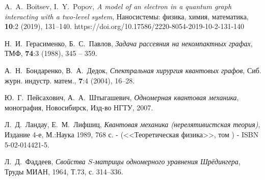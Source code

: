 \documentclass[a4 paper, 12 pt]{extarticle}
\newcommand{\RomanNumeralCaps}[1]
{\MakeUppercase{\romannumeral #1}}
\begin{document}
\begin{thebibliography}{1}
	 A.~A.~Boitsev, I.~Y.~Popov, {\it A model of an electron in a quantum graph interacting with a two-level system}, Наносистемы: физика, химия, математика, \textbf{10}:2 (2019), 131--140. https://doi.org/10.17586/2220-8054-2019-10-2-131-140
	
	 Н.~И.~Герасименко, Б.~С.~Павлов, {\it Задача рассеяния на некомпактных графах}, ТМФ, \textbf{74}:3 (1988), 345 -- 359.
	
	 А.~Н.~Бондаренко, В.~А.~Дедок, {\it Спектральная хирургия квантовых графов}, Сиб. журн. индустр. матем., \textbf{7}:4 (2004), 16--28.
	
	 Ю.~Г.~Пейсахович, А.~А.~Штыгашевич, {\it Одномерная квантовая механика}, монография, Новосибирск, Изд-во НГТУ, 2007.
	
	 Л.~Д.~Ландау, Е.~М.~Лифшиц, {\it Квантовая механика (нерелятивистская теория)}, Издание 4-е, М.:Наука 1989, 768 с. - (<<Теоретическая физика>>, том \RomanNumeralCaps{3}) - ISBN 5-02-014421-5.
	
	 Л.~Д.~Фаддеев, {\it Свойства $S$-матрицы одномерного уравнения Шрёдингера}, Труды МИАН, 1964, Т.73, с. 314--336.
	
	
	
\end{thebibliography}
\end{document}

